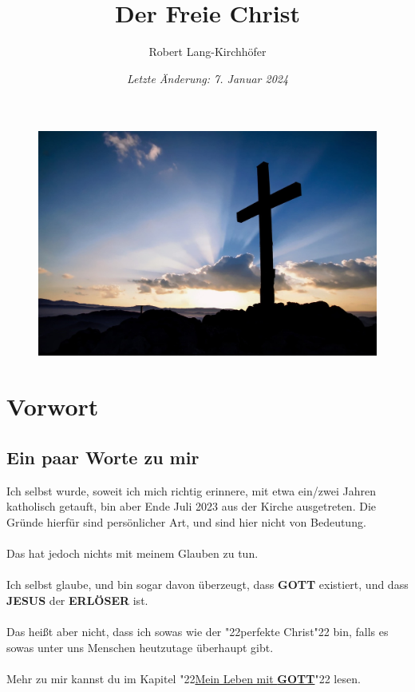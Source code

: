 \documentclass[12pt,a5paper]{article}
\title{\textbf{Der Freie Christ}}
\author{Robert Lang-Kirchh\"ofer}
\date{\textit{Letzte \"Anderung: 7. Januar 2024}}
\newcommand{\Erloeser}[0]{\textbf{ERL\"OSER}}
\newcommand{\Gott}[0]{\textbf{GOTT}}
\newcommand{\Jesus}[0]{\textbf{JESUS}}
\newcommand{\q}[1]{\char"22{#1}\char"22 }
\begin{document}
	\setlength{\parindent}{0mm}
	\maketitle
	\begin{figure}[h]
		\centering
		\includegraphics[width=1\textwidth,keepaspectratio]{"FreeChristian.jpeg"}
	\end{figure}

	\newpage
	\pagecolor{white}
	\tableofcontents
	
	\newpage
	\section{Vorwort}
	
	\subsection{Ein paar Worte zu mir}
		Ich selbst wurde,
		soweit ich mich richtig erinnere,
		mit etwa ein/zwei Jahren katholisch getauft,
		bin aber Ende Juli 2023 aus der Kirche ausgetreten.
		Die Gr\"unde hierf\"ur sind pers\"onlicher Art,
		und sind hier nicht von Bedeutung.
		\\
		\\
		Das hat jedoch nichts mit meinem Glauben zu tun.
		\\
		\\
		Ich selbst glaube,
		und bin sogar davon \"uberzeugt,
		dass {\Gott} existiert,
		und dass {\Jesus} der {\Erloeser} ist.
		\\
		\\
		Das hei{\ss}t aber nicht,
		dass ich sowas wie der \q{perfekte Christ} bin,
		falls es sowas unter uns Menschen heutzutage \"uberhaupt gibt.
		\\
		\\
		Mehr zu mir kannst du im Kapitel \q{\hyperref[MeinLebenMitGott]{Mein Leben mit {\Gott}}} lesen.
\end{document}
